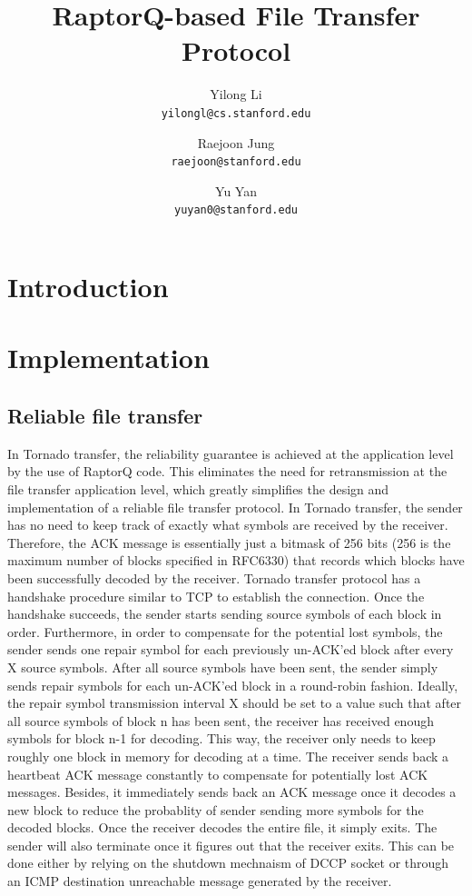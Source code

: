\documentclass{sig-alternate-10pt}
\begin{document}
\title{RaptorQ-based File Transfer Protocol}
\author{
  Yilong Li\\
  \texttt{yilongl@cs.stanford.edu}
  \and 
  Raejoon Jung\\
  \texttt{raejoon@stanford.edu}
  \and
  Yu Yan\\
  \texttt{yuyan0@stanford.edu}
}

\maketitle
\section{Introduction}

\section{Implementation}

\subsection{Reliable file transfer}

In Tornado transfer, the reliability guarantee is achieved at the application level by the use of RaptorQ code. This eliminates the need for retransmission at the file transfer application level, which greatly simplifies the design and implementation of a reliable file transfer protocol. In Tornado transfer, the sender has no need to keep track of exactly what symbols are received by the receiver. Therefore, the ACK message is essentially just a bitmask of 256 bits (256 is the maximum number of blocks specified in RFC6330) that records which blocks have been successfully decoded by the receiver. Tornado transfer protocol has a handshake procedure similar to TCP to establish the connection. Once the handshake succeeds, the sender starts sending source symbols of each block in order. Furthermore, in order to compensate for the potential lost symbols, the sender sends one repair symbol for each previously un-ACK'ed block after every X source symbols. After all source symbols have been sent, the sender simply sends repair symbols for each un-ACK'ed block in a round-robin fashion. Ideally, the repair symbol transmission interval X should be set to a value such that after all source symbols of block n has been sent, the receiver has received enough symbols for block n-1 for decoding. This way, the receiver only needs to keep roughly one block in memory for decoding at a time. The receiver sends back a heartbeat ACK message constantly to compensate for potentially lost ACK messages. Besides, it immediately sends back an ACK message once it decodes a new block to reduce the probablity of sender sending more symbols for the decoded blocks. Once the receiver decodes the entire file, it simply exits. The sender will also terminate once it figures out that the receiver exits. This can be done either by relying on the shutdown mechnaism of DCCP socket or through an ICMP destination unreachable message generated by the receiver.
\end{document}
